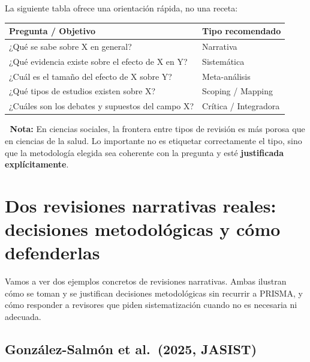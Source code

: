 \documentclass[
]{book}
\newcounter{none} %
\begin{document}
La siguiente tabla ofrece una orientación rápida, no una receta:

{\def\LTcaptype{none} %
\begin{longtable}[]{@{}
  >{\raggedright\arraybackslash}p{}
  >{\raggedright\arraybackslash}p{}@{}}
\toprule\noalign{}
\begin{minipage}[b]{\linewidth}\raggedright
Pregunta / Objetivo
\end{minipage} & \begin{minipage}[b]{\linewidth}\raggedright
Tipo recomendado
\end{minipage} \\
\midrule\noalign{}
\endhead
\bottomrule\noalign{}
\endlastfoot
¿Qué se sabe sobre X en general? & Narrativa \\
¿Qué evidencia existe sobre el efecto de X en Y? & Sistemática \\
¿Cuál es el tamaño del efecto de X sobre Y? & Meta-análisis \\
¿Qué tipos de estudios existen sobre X? & Scoping / Mapping \\
¿Cuáles son los debates y supuestos del campo X? & Crítica / Integradora \\
\end{longtable}
}

👣 \textbf{Nota:} En ciencias sociales, la frontera entre tipos de revisión es más porosa que en ciencias de la salud. Lo importante no es etiquetar correctamente el tipo, sino que la metodología elegida sea coherente con la pregunta y esté \textbf{justificada explícitamente}.

\section{Dos revisiones narrativas reales: decisiones metodológicas y cómo defenderlas}\label{dos-revisiones-narrativas-reales-decisiones-metodoluxf3gicas-y-cuxf3mo-defenderlas}

Vamos a ver dos ejemplos concretos de revisiones narrativas. Ambas ilustran cómo se toman y se justifican decisiones metodológicas sin recurrir a PRISMA, y cómo responder a revisores que piden sistematización cuando no es necesaria ni adecuada.

\subsection{González-Salmón et al.~(2025, JASIST)}\label{gonzuxe1lez-salmuxf3n-et-al.-2025-jasist}
\end{document}
